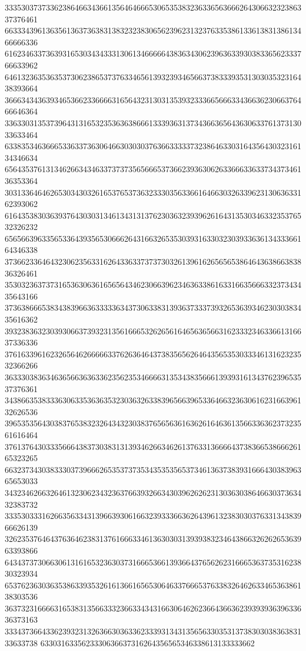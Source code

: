 33353037373362386466343661356464666530653538323633656366626430663232386337376461
66333439613635613637363831383232383065623962313237633538613361383138613466666336
61623463373639316530343433313061346666643836343062396363393038336562333766633962
64613236353635373062386537376334656139323934656637383339353130303532316438393664
36663434363934653662336666316564323130313539323336656663343663623066376466646364
33633031353739643131653235363638666133393631373436636564363063376137313033633464
63383534636665336337363064663030303763663333373238646330316435643032316134346634
65643537613134626634346337373735656665373662393630626336663363373437346136353364
30313364646265303430326165376537363233303563366164663032633962313063633162393062
61643538303639376430303134613431313762303632393962616431353034633235376532326232
65656639633565336439356530666264316632653530393163303230393363613433366164346338
37366233646432306235633162643363373737303261396162656565386464363866383836326461
35303236373731653630636165656434623066396234636338616331663566633237343435643166
37363866653834383966363333363437306338313936373337393265363934623030383435616362
39323836323039306637393231356166653262656164656365663162333234633661316637336336
37616339616232656462666663376263646437383565626464356535303334613162323532366266
36333038363463656636363362356235346666313534383566613939316134376239653537376361
34386635383336306335363635323036326338396566396533646632363061623166396132626536
39653535643038376538323264343230383765656361636261646361356633636237323561616464
37613764303335666438373038313139346266346261376331366664373836653866626165323265
66323734303833303739666265353737353435353565373461363738393166643038396365653033
34323462663264613230623432363766393266343039626262313036303864663037363432383732
33353033316266356334313966393061663239333663626439613238303037633134383966626139
32623537646437636462383137616663346136303031393938323464386632626265363963393866
64343737306630613161653236303731666536613936643765626231666536373531623830323934
65376236303635386339353261613661656530646337666537633832646263346536386138303536
36373231666631653831356633323663343431663064626236643663623939393639633636373163
33343736643362393231326366303633623339313431356563303531373830303836383133633738
6330316335623330636637316264356565346338613133333662
